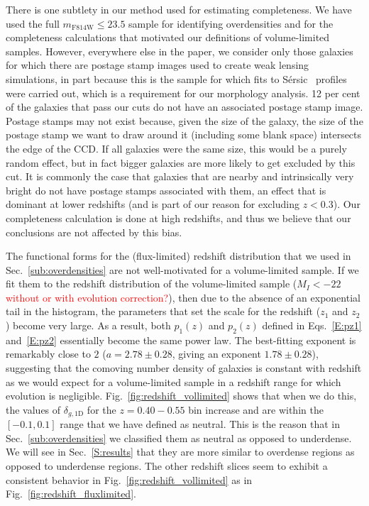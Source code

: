 \documentclass[twocolumn,useAMS,usenatbib]{mn2e}
\newcommand{\rachel}[1]{{\textcolor{red}{#1}}}
\newcommand{\sersic}{S\'{e}rsic }
\begin{document}
There is one subtlety in our method used for estimating
completeness. We have used the full $m_\text{F814W}\le23.5$ sample
for identifying
overdensities and for the completeness calculations that motivated our
definitions of volume-limited samples.  However, everywhere else in the paper, we consider only those galaxies for which there are postage stamp
images used to create weak lensing simulations, in part because this is the
sample for which fits to \sersic\ profiles were carried out, which is a
requirement for our morphology analysis.  
12 per cent of the galaxies that pass our cuts do not have an
associated postage stamp image.
Postage stamps may not exist because, given the size of the galaxy,
the size of the postage stamp we want to draw around it (including
some blank space) intersects the edge of the CCD.
If all galaxies were the same size, this would be a purely random effect, but in fact bigger galaxies are more likely to get excluded by this cut. 
It is commonly the case that  galaxies that are nearby and
intrinsically very bright do not have postage stamps associated with
them, an effect that is dominant at lower redshifts (and is part of
our reason for excluding $z<0.3$). 
Our completeness calculation is done at high redshifts, and thus we
believe that our conclusions are not affected by this bias.  


The functional forms for the (flux-limited) redshift distribution that
we used in Sec.~\ref{sub:overdensities} are not well-motivated for a
volume-limited sample. If we fit them to the 
redshift distribution of the volume-limited sample ($M_I < -22$
\rachel{without or with evolution correction?}), then 
due to the absence of an exponential tail in the histogram, the
parameters that set the scale for the redshift ($z_1$ and $z_2$)
become very large.  As a result, both  $p_1(z)$ and $p_2(z)$ defined
in Eqs.~\eqref{E:pz1} and~\eqref{E:pz2} essentially become the same power law.
The best-fitting exponent is remarkably close to $2$ ($a=2.78\pm
0.28$, giving an exponent $1.78\pm 0.28$), suggesting that the
comoving number density of galaxies is constant with redshift as we
would expect for a volume-limited sample in a redshift range for which
evolution is negligible. 
Fig.~\ref{fig:redshift_vollimited} shows that when we do
this, the values of $\delta_{g,\text{1D}}$ for the $z=0.40-0.55$ bin
increase and are within the $[-0.1, 0.1]$ range that we have defined
as neutral. This is the reason that in Sec.~\ref{sub:overdensities} we classified them as neutral as opposed to underdense.
We will see in Sec.~\ref{S:results} that they are more similar to overdense regions as opposed to underdense regions.
The other redshift slices seem to exhibit a consistent behavior in
Fig.~\ref{fig:redshift_vollimited} as in Fig.~\ref{fig:redshift_fluxlimited}. 
\end{document}
